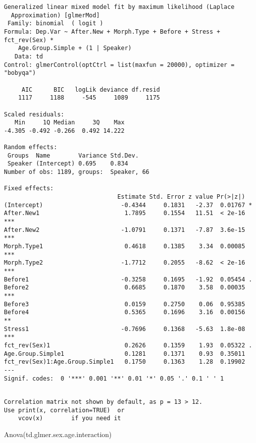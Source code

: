 \documentclass[
  10pt,
  letterpaper]{article}
\newenvironment{Shaded}{\begin{snugshade}}{\end{snugshade}}
\newcommand{\FunctionTok}[1]{\textcolor[rgb]{0.28,0.35,0.67}{#1}}
\newcommand{\NormalTok}[1]{\textcolor[rgb]{0.00,0.23,0.31}{#1}}
\begin{document}
\begin{verbatim}
Generalized linear mixed model fit by maximum likelihood (Laplace
  Approximation) [glmerMod]
 Family: binomial  ( logit )
Formula: Dep.Var ~ After.New + Morph.Type + Before + Stress + fct_rev(Sex) *  
    Age.Group.Simple + (1 | Speaker)
   Data: td
Control: glmerControl(optCtrl = list(maxfun = 20000), optimizer = "bobyqa")

     AIC      BIC   logLik deviance df.resid 
    1117     1188     -545     1089     1175 

Scaled residuals: 
   Min     1Q Median     3Q    Max 
-4.305 -0.492 -0.266  0.492 14.222 

Random effects:
 Groups  Name        Variance Std.Dev.
 Speaker (Intercept) 0.695    0.834   
Number of obs: 1189, groups:  Speaker, 66

Fixed effects:
                                Estimate Std. Error z value Pr(>|z|)    
(Intercept)                      -0.4344     0.1831   -2.37  0.01767 *  
After.New1                        1.7895     0.1554   11.51  < 2e-16 ***
After.New2                       -1.0791     0.1371   -7.87  3.6e-15 ***
Morph.Type1                       0.4618     0.1385    3.34  0.00085 ***
Morph.Type2                      -1.7712     0.2055   -8.62  < 2e-16 ***
Before1                          -0.3258     0.1695   -1.92  0.05454 .  
Before2                           0.6685     0.1870    3.58  0.00035 ***
Before3                           0.0159     0.2750    0.06  0.95385    
Before4                           0.5365     0.1696    3.16  0.00156 ** 
Stress1                          -0.7696     0.1368   -5.63  1.8e-08 ***
fct_rev(Sex)1                     0.2626     0.1359    1.93  0.05322 .  
Age.Group.Simple1                 0.1281     0.1371    0.93  0.35011    
fct_rev(Sex)1:Age.Group.Simple1   0.1750     0.1363    1.28  0.19902    
---
Signif. codes:  0 '***' 0.001 '**' 0.01 '*' 0.05 '.' 0.1 ' ' 1
\end{verbatim}

\begin{verbatim}

Correlation matrix not shown by default, as p = 13 > 12.
Use print(x, correlation=TRUE)  or
    vcov(x)        if you need it
\end{verbatim}

\begin{Shaded}
\begin{Highlighting}[]
\FunctionTok{Anova}\NormalTok{(td.glmer.sex.age.interaction)}
\end{Highlighting}
\end{Shaded}
\end{document}
